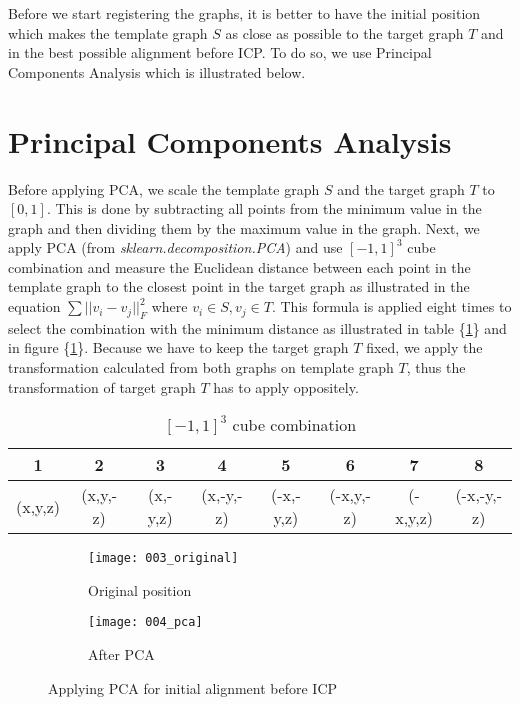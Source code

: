\documentclass[../structure.tex]{subfiles}
\begin{document}
\hspace{2em}Before we start registering the graphs, it is better to have the initial position which makes the template graph $S$ as close as possible to the target graph $T$ and in the best possible alignment before ICP. To do so, we use Principal Components Analysis which is illustrated below.

\section{Principal Components Analysis }
\hspace{2em}Before applying PCA, we scale the template graph $S$ and the target graph $T$ to $[0,1]$. This is done by subtracting all points from the minimum value in the graph and then dividing them by the maximum value in the graph. Next, we apply PCA (from \textit{sklearn.decomposition.PCA}) and use $[-1,1]^3$ cube combination and measure the Euclidean distance between each point in the template graph to the closest point in the target graph as illustrated in the equation $\sum ||v_i-v_j||_F^2$ where $v_i \in S, v_j \in T$. This formula is applied eight times to select the combination with the minimum distance as illustrated in table \{\ref{table:cube}\} and in figure \{\ref{fig:pca}\}. Because we have to keep the target graph $T$ fixed, we apply the transformation calculated from both graphs on template graph $T$, thus the transformation of target graph $T$ has to apply oppositely.
\vspace{2em}
\begin{center}
\begin{table}[h]
	\begin{tabular}{| c | c | c | c | c | c | c | c |}
	\hline
	1 & 2 & 3 & 4 & 5 & 6 & 7 & 8\\
	\hline
	(x,y,z) & (x,y,-z) & (x,-y,z) & (x,-y,-z) & (-x,-y,z) & (-x,y,-z) & (-x,y,z) & (-x,-y,-z)\\
	\hline
	\end{tabular}
\caption{$[-1,1]^3$ cube combination}
\label{table:cube}
\end{table}
\end{center}

\begin{figure}[h!]
	\centering
	\begin{subfigure}[b]{0.59\textwidth}
	\texttt{[image: 003\_original]}
	\caption{Original position}
	\end{subfigure}
	\begin{subfigure}[b]{0.40\textwidth}
	\texttt{[image: 004\_pca]}
	\caption{After PCA}
	\end{subfigure}
\caption{Applying PCA for initial alignment before ICP}
\label{fig:pca}
\end{figure}
\end{document}
